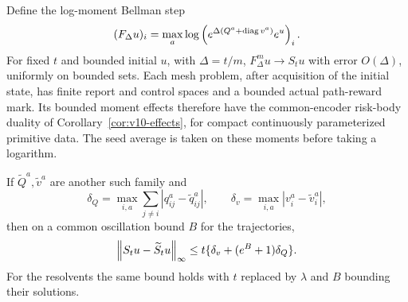 \begin{theorem}
\label{thm:v10-nisio-mesh}
Define the log-moment Bellman step
\[
 (F_\Delta u)_i
 =\max_a\log\left( e^{\Delta(Q^a+\operatorname{diag} v^a)}e^u\right)_i.
\]
For fixed $t$ and bounded initial $u$, with $\Delta=t/m$,
$F_\Delta^m u\to S_tu$ with error $O(\Delta)$, uniformly on bounded
sets. Each mesh problem, after acquisition of the initial state, has
finite report and control spaces and a bounded actual path-reward mark.
Its bounded moment effects therefore have the common-encoder
risk-body duality of Corollary~\ref{cor:v10-effects}, for compact
continuously parameterized primitive data. The seed average is taken on these
moments before taking a logarithm.

If $\widetilde Q^a,\widetilde v^a$ are another such family and
\[
 \delta_Q=\max_{i,a}\sum_{j\ne i}|q_{ij}^a-\widetilde q_{ij}^a|,
 \qquad \delta_v=\max_{i,a}|v_i^a-\widetilde v_i^a|,
\]
then on a common oscillation bound $B$ for the trajectories,
\[
 \left\lVert S_tu-\widetilde S_tu\right\rVert_\infty
 \le t\{\delta_v+(e^B+1)\delta_Q\}.
\]
For the resolvents the same bound holds with $t$ replaced by
$\lambda$ and $B$ bounding their solutions.
\end{theorem}
